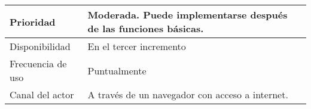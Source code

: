 \begin{table}[htpb]
\begin{tabularx}{\textwidth}{|X|X|}
Prioridad                         & Moderada. Puede implementarse después de las funciones básicas.                                                                                                                                                                                                                                                                                                                                                                                                                                                                                                                                                                                                                    \\ \hline
Disponibilidad                    & En el tercer incremento                                                                                                                                                                                                                                                                                                                                                                                                                                                                                                                                                                                                                                                            \\ \hline
Frecuencia de uso                 & Puntualmente                                                                                                                                                                                                                                                                                                                                                                                                                                                                                                                                                                                                                                                                       \\ \hline
Canal del actor                   & A través de un navegador con acceso a internet.                                                                                                                                                                                                                                                                                                                                                                                                                                                                                                                                                                                                                                    \\ \hline

\end{tabularx}
\end{table}
